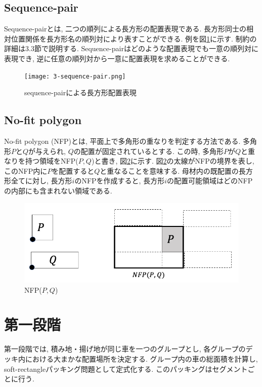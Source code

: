 \subsection{Sequence-pair}
Sequence-pairとは, 二つの順列による長方形の配置表現である\cite{seq-pair}. 
長方形同士の相対位置関係を長方形名の順列対により表すことができる. 
例を図\ref{s-p-eg}に示す. 制約の詳細は3.3節で説明する. 
Sequence-pairはどのような配置表現でも一意の順列対に表現でき, 逆に任意の順列対から一意に配置表現を求めることができる. \\ 

\begin{figure}[b]
    \hspace{2cm}
    \texttt{[image: 3-sequence-pair.png]}
    \caption{sequence-pairによる長方形配置表現}
    \label{s-p-eg}
\end{figure}
\clearpage

\subsection{No-fit polygon}
No-fit polygon (NFP)とは, 平面上で多角形の重なりを判定する方法である\cite{nfp}\cite{nfp2}. 
多角形$P$と$Q$が与えられ, $Q$の配置が固定されているとする. 
この時, 多角形$P$が$Q$と重なりを持つ領域をNFP($P,Q$)と書き, 図\ref{nfp-eg}に示す. 
図\ref{nfp-eg}の太線がNFPの境界を表し, このNFP内に$P$を配置すると$Q$と重なることを意味する. 
母材内の既配置の長方形全てに対し, 長方形$i$のNFPを作成すると, 長方形$i$の配置可能領域はどのNFPの内部にも含まれない領域である. \\


\begin{figure}[tbp]
    \hspace{3cm}
    \includegraphics[scale = 0.3, bb=0 0 10 10]{3nfp.png}
    \caption{NFP($P,Q$)}
    \label{nfp-eg}
\end{figure}

\section{第一段階}
第一段階では, 積み地・揚げ地が同じ車を一つのグループとし, 各グループのデッキ内における大まかな配置場所を決定する. 
グループ内の車の総面積を計算し, soft-rectangleパッキング問題として定式化する. 
このパッキングはセグメントごとに行う. 

